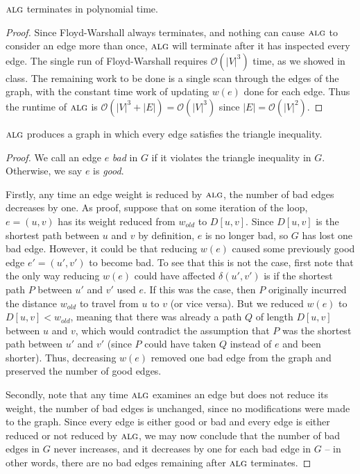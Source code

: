 \documentclass[11pt]{article}
\renewcommand{\O}{\mathcal{O}}
\newcommand{\alg}{\textsc{alg}}
\begin{document}
 $\alg$ terminates in polynomial time.
\begin{proof}
  Since Floyd-Warshall always terminates, and nothing can cause $\alg$ to consider an edge more than once, $\alg$ will terminate after it has inspected every edge.
  The single run of Floyd-Warshall requires $\O(|V|^3)$ time, as we showed in class.
  The remaining work to be done is a single scan through the edges of the graph, with the constant time work of updating $w(e)$ done for each edge.
  Thus the runtime of $\alg$ is $\O(|V|^3 + |E|) = \O(|V|^3)$ since $|E| = \O(|V|^2)$.
\end{proof}

 $\alg$ produces a graph in which every edge satisfies the triangle inequality.
\begin{proof}
  We call an edge $e$ {\em bad\/} in $G$ if it violates the triangle inequality in $G$.
  Otherwise, we say $e$ is {\em good}.

  Firstly, any time an edge weight is reduced by $\alg$, the number of bad edges decreases by one.
  As proof, suppose that on some iteration of the loop, $e = (u, v)$ has its weight reduced from $w_{old}$ to $D[u, v]$.
  Since $D[u, v]$ is the shortest path between $u$ and $v$ by definition, $e$ is no longer bad, so $G$ has lost one bad edge.
  However, it could be that reducing $w(e)$ caused some previously good edge $e' = (u', v')$ to become bad.
  To see that this is not the case, first note that the only way reducing $w(e)$ could have affected $\delta(u', v')$ is if the shortest path $P$ between $u'$ and $v'$ used $e$.
  If this was the case, then $P$ originally incurred the distance $w_{old}$ to travel from $u$ to $v$ (or vice versa).
  But we reduced $w(e)$ to $D[u, v] < w_{old}$, meaning that there was already a path $Q$ of length $D[u, v]$ between $u$ and $v$, which would contradict the assumption that $P$ was the shortest path between $u'$ and $v'$ (since $P$ could have taken $Q$ instead of $e$ and been shorter).
  Thus, decreasing $w(e)$ removed one bad edge from the graph and preserved the number of good edges.

  Secondly, note that any time $\alg$ examines an edge but does not reduce its weight, the number of bad edges is unchanged, since no modifications were made to the graph.
  Since every edge is either good or bad and every edge is either reduced or not reduced by $\alg$, we may now conclude that the number of bad edges in $G$ never increases, and it decreases by one for each bad edge in $G$ -- in other words, there are no bad edges remaining after $\alg$ terminates.
\end{proof}
\end{document}
